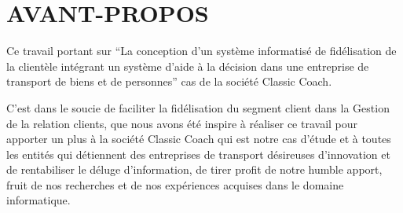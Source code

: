 \chapter*{AVANT-PROPOS}
Ce travail portant sur \enquote{La conception d’un système informatisé de fidélisation
de la clientèle intégrant un système d’aide à la décision dans une entreprise de transport
de biens et de personnes} cas de la société Classic Coach.
\par
C’est dans le soucie de faciliter la fidélisation du segment client
dans la Gestion de la relation clients, que nous avons été inspire
à réaliser ce travail pour apporter un plus à la société Classic Coach
qui est notre cas d’étude et à toutes les entités qui détiennent des entreprises
de transport désireuses d’innovation et de rentabiliser le 
déluge d’information, de tirer profit de notre humble apport, fruit
de nos recherches et de nos expériences acquises dans le domaine informatique.